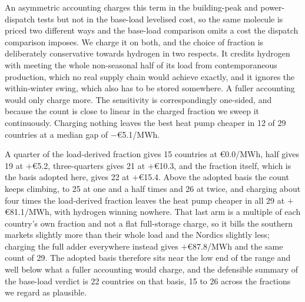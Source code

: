 An asymmetric accounting charges this term in the building-peak and power-dispatch tests
but not in the base-load levelised cost, so the same molecule is priced two different ways
and the base-load comparison omits a cost the dispatch comparison imposes. We charge it on
both, and the choice of fraction is deliberately conservative towards
hydrogen in two respects. It credits hydrogen with meeting the whole non-seasonal half
of its load from contemporaneous production, which no real supply chain would achieve
exactly, and it ignores the within-winter swing, which also has to be stored somewhere.
A fuller accounting would only charge more. The sensitivity is correspondingly
one-sided, and because the count is close to linear in the charged fraction we sweep it
continuously. Charging nothing leaves the best heat pump cheaper
in 12 of 29 countries at a median gap of $-$\euro{}5.1/MWh.

A quarter of the load-derived fraction gives 15 countries at \euro{}0.0/MWh, half gives
19 at $+$\euro{}5.2, three-quarters gives 21 at $+$\euro{}10.3, and the fraction itself,
which is the basis adopted here, gives 22 at $+$\euro{}15.4. Above the adopted basis the
count keeps climbing, to 25 at one and a half times and 26 at twice, and charging about
four times the load-derived fraction leaves the heat pump cheaper in all 29 at $+$\euro{}81.1/MWh, with hydrogen winning nowhere. That last arm is a multiple of each
country's own fraction and not a flat full-storage charge, so it bills the southern
markets slightly more than their whole load and the Nordics slightly less; charging the
full adder everywhere instead gives $+$\euro{}87.8/MWh and the same count of 29. The adopted basis therefore
sits near the low end of the range and well below what a fuller accounting would charge,
and the defensible summary of the base-load verdict is 22 countries on that basis, 15 to
26 across the fractions we regard as plausible.

